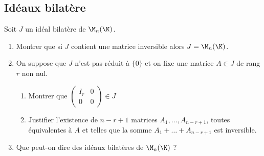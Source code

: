 \documentclass[8pt]{book}
\begin{document}
	\subsection{Idéaux bilatère }
	Soit $J$ un idéal bilatère de $\M_n(\K)$.
	\begin{enumerate}
		\item Montrer que si $J$ contient une matrice inversible alors $J=\M_n(\K)$.
		\item On suppose que $J$ n'est pas réduit à $\{0\}$ et on fixe une matrice $A\in J$ de rang $r$ non nul.
		\begin{enumerate}[label=\alph*.]
			\item Montrer que $\begin{pmatrix}
				I_r & 0\\
				0   & 0
			\end{pmatrix}\in J$
			\item Justifier l'existence de $n-r+1$ matrices $A_1,\dots,A_{n-r+1}$, toutes équivalentes à $A$ et telles que la somme $A_1+\dots+A_{n-r+1}$ est inversible. 
		\end{enumerate}
		\item Que peut-on dire des idéaux bilatères de $\M_n(\K)$ ?
	\end{enumerate}
	
\end{document}
